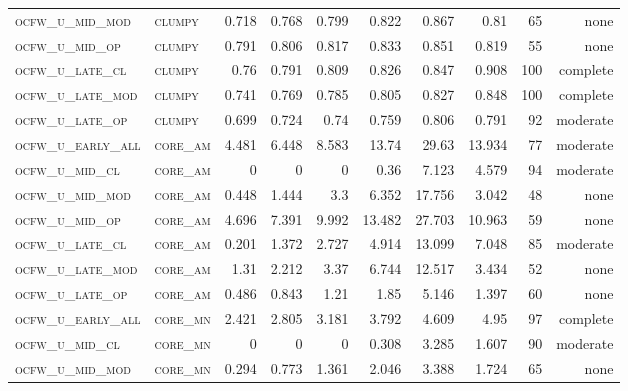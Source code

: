 \begin{landscape}
\begin{center}
\begin{footnotesize}
\begin{longtable}{llrrrrr|rrr}
\textsc{ocfw\_u\_mid\_mod  } & \textsc{clumpy    }    & 0.718    & 0.768    & 0.799    & 0.822    & 0.867    & 0.81     & 65  & none     \\
\textsc{ocfw\_u\_mid\_op   } & \textsc{clumpy    }    & 0.791    & 0.806    & 0.817    & 0.833    & 0.851    & 0.819    & 55  & none     \\
\textsc{ocfw\_u\_late\_cl  } & \textsc{clumpy    }    & 0.76     & 0.791    & 0.809    & 0.826    & 0.847    & 0.908    & 100 & complete \\
\textsc{ocfw\_u\_late\_mod } & \textsc{clumpy    }    & 0.741    & 0.769    & 0.785    & 0.805    & 0.827    & 0.848    & 100 & complete \\
\textsc{ocfw\_u\_late\_op  } & \textsc{clumpy    }    & 0.699    & 0.724    & 0.74     & 0.759    & 0.806    & 0.791    & 92  & moderate \\
\textsc{ocfw\_u\_early\_all} & \textsc{core\_am  }    & 4.481    & 6.448    & 8.583    & 13.74    & 29.63    & 13.934   & 77  & moderate \\
\textsc{ocfw\_u\_mid\_cl   } & \textsc{core\_am  }    & 0        & 0        & 0        & 0.36     & 7.123    & 4.579    & 94  & moderate \\
\textsc{ocfw\_u\_mid\_mod  } & \textsc{core\_am  }    & 0.448    & 1.444    & 3.3      & 6.352    & 17.756   & 3.042    & 48  & none     \\
\textsc{ocfw\_u\_mid\_op   } & \textsc{core\_am  }    & 4.696    & 7.391    & 9.992    & 13.482   & 27.703   & 10.963   & 59  & none     \\
\textsc{ocfw\_u\_late\_cl  } & \textsc{core\_am  }    & 0.201    & 1.372    & 2.727    & 4.914    & 13.099   & 7.048    & 85  & moderate \\
\textsc{ocfw\_u\_late\_mod } & \textsc{core\_am  }    & 1.31     & 2.212    & 3.37     & 6.744    & 12.517   & 3.434    & 52  & none     \\
\textsc{ocfw\_u\_late\_op  } & \textsc{core\_am  }    & 0.486    & 0.843    & 1.21     & 1.85     & 5.146    & 1.397    & 60  & none     \\
\textsc{ocfw\_u\_early\_all} & \textsc{core\_mn  }    & 2.421    & 2.805    & 3.181    & 3.792    & 4.609    & 4.95     & 97  & complete \\
\textsc{ocfw\_u\_mid\_cl   } & \textsc{core\_mn  }    & 0        & 0        & 0        & 0.308    & 3.285    & 1.607    & 90  & moderate \\
\textsc{ocfw\_u\_mid\_mod  } & \textsc{core\_mn  }    & 0.294    & 0.773    & 1.361    & 2.046    & 3.388    & 1.724    & 65  & none     \\

\end{longtable}
\end{footnotesize}
\end{center}
\end{landscape}
